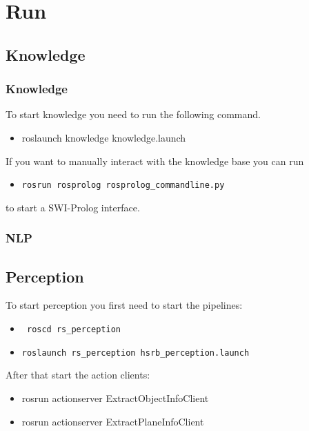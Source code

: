 \documentclass[main.tex]{subfiles}
\begin{document}
\newpage
	\section{Run}
	\subsection{Knowledge}
	\subsubsection{Knowledge}
	To start knowledge you need to run the following command.
	\begin{itemize}
\item roslaunch knowledge knowledge.launch
\end{itemize}
If you want to manually interact with the knowledge base you can run 
\begin{itemize}
\item \begin{verbatim}rosrun rosprolog rosprolog_commandline.py \end{verbatim}
\end{itemize}
to start a SWI-Prolog interface.
	
	\subsubsection{NLP}
	
	\subsection{Perception}

	To start perception you first need to start the pipelines:
	\begin{itemize}
\item \begin{verbatim} roscd rs_perception \end{verbatim} 
\item \begin{verbatim}
roslaunch rs_perception hsrb_perception.launch
\end{verbatim}
\end{itemize}	

After that start the action clients:
\begin{itemize}
\item rosrun actionserver ExtractObjectInfoClient
\item rosrun actionserver ExtractPlaneInfoClient
\end{itemize}
\end{document}
